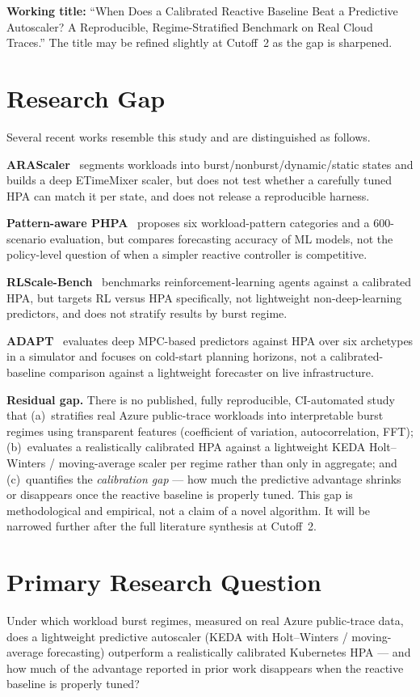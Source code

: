 \documentclass[journal]{IEEEtran}
\begin{document}
\textbf{Working title:} ``When Does a Calibrated Reactive Baseline Beat a Predictive Autoscaler? A Reproducible, Regime-Stratified Benchmark on Real Cloud Traces.'' The title may be refined slightly at Cutoff~2 as the gap is sharpened.

\section{Research Gap}
Several recent works resemble this study and are distinguished as follows.

\textbf{ARAScaler}~\cite{arascaler2025} segments workloads into burst/nonburst/dynamic/static states and builds a deep ETimeMixer scaler, but does not test whether a carefully tuned HPA can match it per state, and does not release a reproducible harness.

\textbf{Pattern-aware PHPA}~\cite{duman2026} proposes six workload-pattern categories and a 600-scenario evaluation, but compares forecasting accuracy of ML models, not the policy-level question of when a simpler reactive controller is competitive.

\textbf{RLScale-Bench}~\cite{rlscale2026} benchmarks reinforcement-learning agents against a calibrated HPA, but targets RL versus HPA specifically, not lightweight non-deep-learning predictors, and does not stratify results by burst regime.

\textbf{ADAPT}~\cite{adapt2026} evaluates deep MPC-based predictors against HPA over six archetypes in a simulator and focuses on cold-start planning horizons, not a calibrated-baseline comparison against a lightweight forecaster on live infrastructure.

\textbf{Residual gap.} There is no published, fully reproducible, CI-automated study that (a)~stratifies real Azure public-trace workloads into interpretable burst regimes using transparent features (coefficient of variation, autocorrelation, FFT); (b)~evaluates a realistically calibrated HPA against a lightweight KEDA Holt--Winters / moving-average scaler per regime rather than only in aggregate; and (c)~quantifies the \emph{calibration gap} --- how much the predictive advantage shrinks or disappears once the reactive baseline is properly tuned. This gap is methodological and empirical, not a claim of a novel algorithm. It will be narrowed further after the full literature synthesis at Cutoff~2.

\section{Primary Research Question}
Under which workload burst regimes, measured on real Azure public-trace data, does a lightweight predictive autoscaler (KEDA with Holt--Winters / moving-average forecasting) outperform a realistically calibrated Kubernetes HPA --- and how much of the advantage reported in prior work disappears when the reactive baseline is properly tuned?
\end{document}

